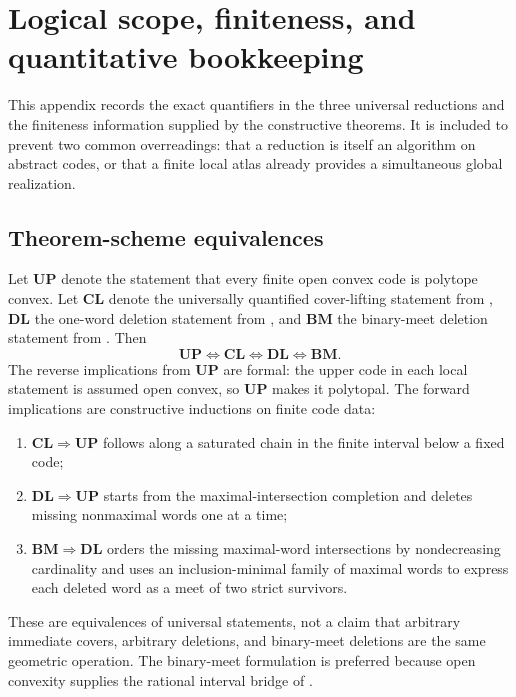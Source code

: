\section{Logical scope, finiteness, and quantitative bookkeeping}
\label{app:logical-scope}

This appendix records the exact quantifiers in the three universal reductions and the finiteness information supplied by the constructive theorems.  It is included to prevent two common overreadings: that a reduction is itself an algorithm on abstract codes, or that a finite local atlas already provides a simultaneous global realization.

\subsection{Theorem-scheme equivalences}

Let $\mathbf{UP}$ denote the statement that every finite open convex code is polytope convex.  Let $\mathbf{CL}$ denote the universally quantified cover-lifting statement from , $\mathbf{DL}$ the one-word deletion statement from , and $\mathbf{BM}$ the binary-meet deletion statement from .  Then
\[
 \mathbf{UP}\Longleftrightarrow\mathbf{CL}
 \Longleftrightarrow\mathbf{DL}
 \Longleftrightarrow\mathbf{BM}.
\]
The reverse implications from $\mathbf{UP}$ are formal: the upper code in each local statement is assumed open convex, so $\mathbf{UP}$ makes it polytopal.  The forward implications are constructive inductions on finite code data:
\begin{enumerate}[label=\textup{(\alph*)}]
\item $\mathbf{CL}\Rightarrow\mathbf{UP}$ follows along a saturated chain in the finite interval below a fixed code;
\item $\mathbf{DL}\Rightarrow\mathbf{UP}$ starts from the maximal-intersection completion and deletes missing nonmaximal words one at a time;
\item $\mathbf{BM}\Rightarrow\mathbf{DL}$ orders the missing maximal-word intersections by nondecreasing cardinality and uses an inclusion-minimal family of maximal words to express each deleted word as a meet of two strict survivors.
\end{enumerate}

These are equivalences of universal statements, not a claim that arbitrary immediate covers, arbitrary deletions, and binary-meet deletions are the same geometric operation.  The binary-meet formulation is preferred because open convexity supplies the rational interval bridge of .

